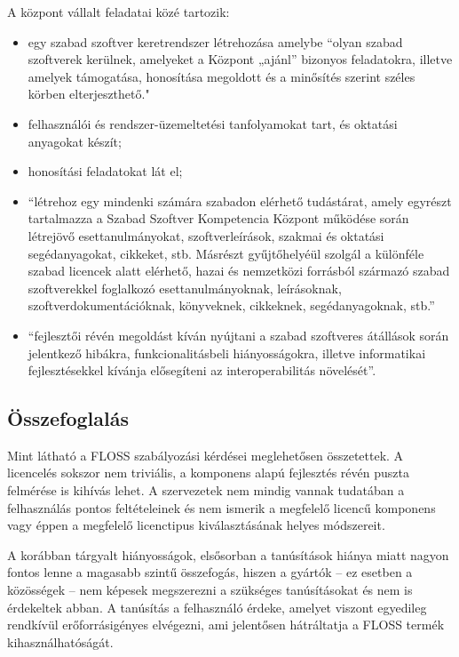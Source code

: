 \documentclass[12pt,magyar,a4paper,oneside]{scrreprt}
\providecommand{\tightlist}{%
  \setlength{\itemsep}{0pt}\setlength{\parskip}{0pt}}
\begin{document}
A központ vállalt feladatai közé tartozik:

\begin{itemize}
\tightlist
\item
  egy szabad szoftver keretrendszer létrehozása amelybe ``olyan szabad
  szoftverek kerülnek, amelyeket a Központ „ajánl'' bizonyos
  feladatokra, illetve amelyek támogatása, honosítása megoldott és a
  minősítés szerint széles körben elterjeszthető."
\item
  felhasználói és rendszer-üzemeltetési tanfolyamokat tart, és oktatási
  anyagokat készít;
\item
  honosítási feladatokat lát el;
\item
  ``létrehoz egy mindenki számára szabadon elérhető tudástárat, amely
  egyrészt tartalmazza a Szabad Szoftver Kompetencia Központ működése
  során létrejövő esettanulmányokat, szoftverleírások, szakmai és
  oktatási segédanyagokat, cikkeket, stb. Másrészt gyűjtőhelyéül szolgál
  a különféle szabad licencek alatt elérhető, hazai és nemzetközi
  forrásból származó szabad szoftverekkel foglalkozó esettanulmányoknak,
  leírásoknak, szoftverdokumentációknak, könyveknek, cikkeknek,
  segédanyagoknak, stb.''
\item
  ``fejlesztői révén megoldást kíván nyújtani a szabad szoftveres
  átállások során jelentkező hibákra, funkcionalitásbeli hiányosságokra,
  illetve informatikai fejlesztésekkel kívánja elősegíteni az
  interoperabilitás növelését''.
\end{itemize}

\hypertarget{uxf6sszefoglaluxe1s-6}{%
\subsection{Összefoglalás}\label{uxf6sszefoglaluxe1s-6}}

Mint látható a FLOSS szabályozási kérdései meglehetősen összetettek. A
licencelés sokszor nem triviális, a komponens alapú fejlesztés révén
puszta felmérése is kihívás lehet. A szervezetek nem mindig vannak
tudatában a felhasználás pontos feltételeinek és nem ismerik a megfelelő
licencű komponens vagy éppen a megfelelő licenctipus kiválasztásának
helyes módszereit.

A korábban tárgyalt hiányosságok, elsősorban a tanúsítások hiánya miatt
nagyon fontos lenne a magasabb szintű összefogás, hiszen a gyártók -- ez
esetben a közösségek -- nem képesek megszerezni a szükséges
tanúsításokat és nem is érdekeltek abban. A tanúsítás a felhasználó
érdeke, amelyet viszont egyedileg rendkívül erőforrásigényes elvégezni,
ami jelentősen hátráltatja a FLOSS termék kihasználhatóságát.
\end{document}
